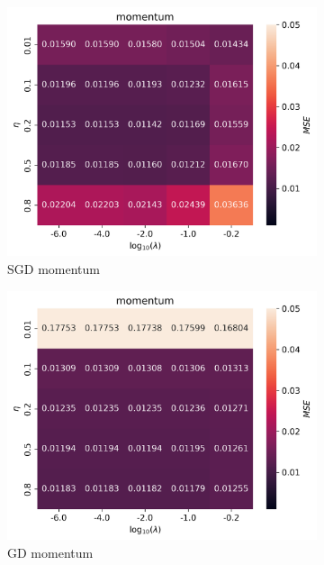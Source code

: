\documentclass[11pt]{article}
\begin{document}
\begin{figure}[H]
    \begin{subfigure}{.5\textwidth}
        \centering
        \includegraphics[width=\textwidth]{../figures/momentum_SGD_eta_lmb.png}
        \caption{SGD momentum}
        \label{fig:}
    \end{subfigure}
    \begin{subfigure}{.5\textwidth}
        \centering
        \includegraphics[width=\textwidth]{../figures/momentum_GD_eta_lmb.png}
        \caption{GD momentum}
        \label{fig:}
    \end{subfigure}
    \begin{subfigure}{.5\textwidth}

\end{subfigure}
\end{figure}
\end{document}
